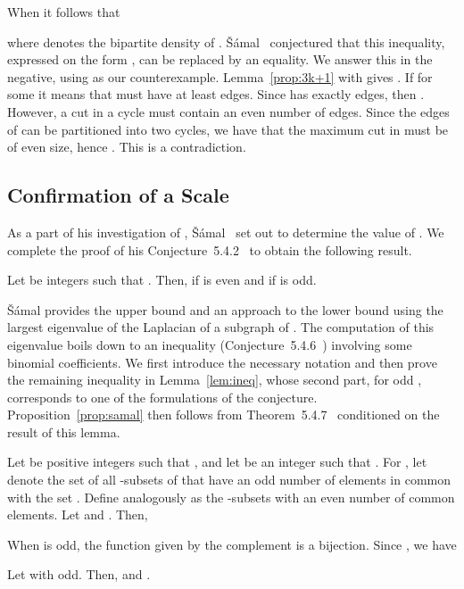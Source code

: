 \documentclass[11pt,a4paper]{article}
\begin{document}
When  it follows that

where  denotes the bipartite density of .
\v{S}\'{a}mal~\cite{samal:06} conjectured that
this inequality, expressed on the form
,
can be replaced by an equality.
We answer this in the negative, using  as our counterexample.
Lemma~\ref{prop:3k+1} with  gives .
If  for some  it means
that  must have at least  edges. 
Since  has exactly  edges, then .
However, a cut in a cycle must contain an even number of edges.
Since the edges of  can be partitioned into two cycles,
we have that the maximum cut in  must be of even size,
hence .
This is a contradiction.

\subsection{Confirmation of a Scale} \label{sec:pos}

As a part of his investigation of , \v{S}\'{a}mal~\cite{samal:06}
set out to determine the value of .
We complete the proof of his Conjecture~5.4.2~\cite{samal:06}
to obtain the following result.
\begin{proposition} \label{prop:samal}
  Let  be integers such that .
  Then, 
 if  is even and  if  is odd. \end{proposition}
\v{S}\'{a}mal provides the upper bound and an approach to the lower bound 
using the largest eigenvalue of the Laplacian of a subgraph of .
The computation of this eigenvalue
boils down to an inequality (Conjecture~5.4.6~\cite{samal:06})
involving some binomial coefficients.
We first introduce the necessary notation and then prove the remaining
inequality in Lemma~\ref{lem:ineq}, whose second part, for odd ,
corresponds to one of the formulations of the conjecture.
Proposition~\ref{prop:samal} then follows from
Theorem~5.4.7~\cite{samal:06} conditioned on the result of this lemma.

  Let  be positive integers such that , and let
   be an integer such that .
  For , let  denote the set of all -subsets of  that have an odd number of elements in common with the set .
  Define  analogously as the -subsets with an even number of common elements.
  Let  and . Then, 


  When  is odd, the function 
  given by the complement 
  is a bijection.
  Since , we have
  
  

  \begin{lemma} \label{lem:help}
    Let  with  odd. Then,
     and .
  \end{lemma}
\end{document}
